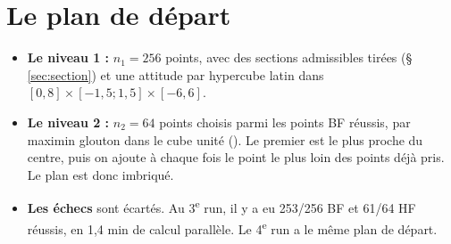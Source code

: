 \documentclass[10pt,a4paper]{article}
\begin{document}
\section{Le plan de départ}
\begin{itemize}
  \item \textbf{Le niveau 1 :} $n_1=256$ points, avec des sections admissibles tirées (§\,\ref{sec:section})
        et une attitude par hypercube latin dans $[0,8]\times[-1{,}5;1{,}5]\times[-6,6]$.
  \item \textbf{Le niveau 2 :} $n_2=64$ points choisis parmi les points BF réussis, par maximin glouton dans
        le cube unité (). Le premier est le plus proche du centre, puis on ajoute à chaque
        fois le point le plus loin des points déjà pris. Le plan est donc imbriqué.
  \item \textbf{Les échecs} sont écartés. Au 3\textsuperscript{e} run, il y a eu 253/256 BF et 61/64 HF
        réussis, en 1,4 min de calcul parallèle. Le 4\textsuperscript{e} run a le même plan de départ.
\end{itemize}

\end{document}
